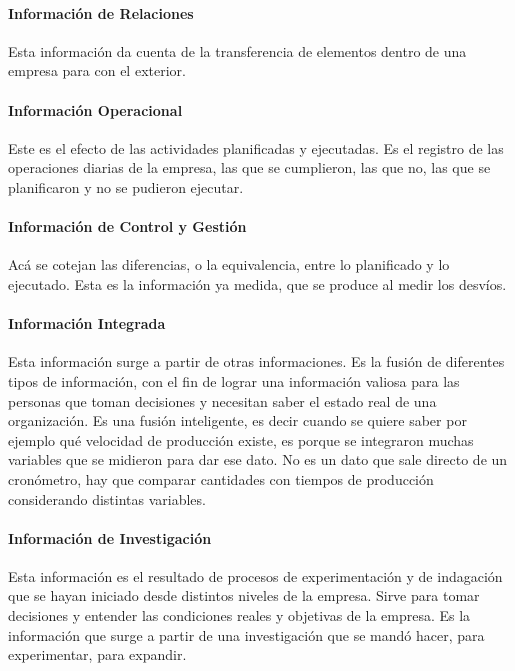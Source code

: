 \hypertarget{informaciuxf3n-de-relaciones}{%
\paragraph*{Información de
Relaciones}\label{informaciuxf3n-de-relaciones}}
Esta información da cuenta de la transferencia de elementos dentro de
una empresa para con el exterior.

\hypertarget{informacion-operacional}{%
\paragraph*{Información Operacional}\label{informacion-operacional}}
Este es el efecto de las actividades planificadas y ejecutadas. Es el
registro de las operaciones diarias de la empresa, las que se
cumplieron, las que no, las que se planificaron y no se pudieron
ejecutar.

\hypertarget{informaciuxf3n-de-control-y-gestiuxf3n}{%
\paragraph*{Información de Control y
Gestión}\label{informaciuxf3n-de-control-y-gestiuxf3n}}
Acá se cotejan las diferencias, o la equivalencia, entre lo planificado
y lo ejecutado. Esta es la información ya medida, que se produce al
medir los desvíos.

\hypertarget{informaciuxf3n-integrada}{%
\paragraph*{Información Integrada}\label{informaciuxf3n-integrada}}
Esta información surge a partir de otras informaciones. Es la fusión de
diferentes tipos de información, con el fin de lograr una información
valiosa para las personas que toman decisiones y necesitan saber el
estado real de una organización. Es una fusión inteligente, es decir
cuando se quiere saber por ejemplo qué velocidad de producción existe,
es porque se integraron muchas variables que se midieron para dar ese
dato. No es un dato que sale directo de un cronómetro, hay que comparar
cantidades con tiempos de producción considerando distintas variables.

\hypertarget{informaciuxf3n-de-investigaciuxf3n}{%
\paragraph*{Información de
Investigación}\label{informaciuxf3n-de-investigaciuxf3n}}
Esta información es el resultado de procesos de experimentación y de
indagación que se hayan iniciado desde distintos niveles de la empresa.
Sirve para tomar decisiones y entender las condiciones reales y
objetivas de la empresa. Es la información que surge a partir de una
investigación que se mandó hacer, para experimentar, para expandir.

\onecolumn
